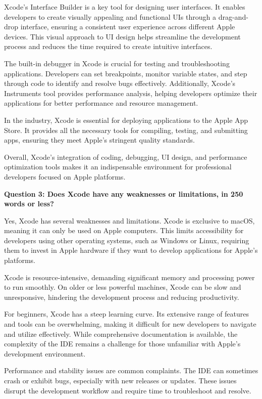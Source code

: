 \documentclass[a4paper, 11pt]{report}
\begin{document}
Xcode’s Interface Builder is a key tool for designing user interfaces. It enables developers to create visually appealing and functional UIs through a drag-and-drop interface, ensuring a consistent user experience across different Apple devices. This visual approach to UI design helps streamline the development process and reduces the time required to create intuitive interfaces.

The built-in debugger in Xcode is crucial for testing and troubleshooting applications. Developers can set breakpoints, monitor variable states, and step through code to identify and resolve bugs effectively. Additionally, Xcode’s Instruments tool provides performance analysis, helping developers optimize their applications for better performance and resource management.

In the industry, Xcode is essential for deploying applications to the Apple App Store. It provides all the necessary tools for compiling, testing, and submitting apps, ensuring they meet Apple’s stringent quality standards.

Overall, Xcode’s integration of coding, debugging, UI design, and performance optimization tools makes it an indispensable environment for professional developers focused on Apple platforms.

\vspace{\baselineskip}
\textbf{Question 3: Does Xcode have any weaknesses or limitations, in 250 words or less?}

Yes, Xcode has several weaknesses and limitations. Xcode is exclusive to macOS, meaning it can only be used on Apple computers. This limits accessibility for developers using other operating systems, such as Windows or Linux, requiring them to invest in Apple hardware if they want to develop applications for Apple's platforms.

Xcode is resource-intensive, demanding significant memory and processing power to run smoothly. On older or less powerful machines, Xcode can be slow and unresponsive, hindering the development process and reducing productivity.

For beginners, Xcode has a steep learning curve. Its extensive range of features and tools can be overwhelming, making it difficult for new developers to navigate and utilize effectively. While comprehensive documentation is available, the complexity of the IDE remains a challenge for those unfamiliar with Apple's development environment.

Performance and stability issues are common complaints. The IDE can sometimes crash or exhibit bugs, especially with new releases or updates. These issues disrupt the development workflow and require time to troubleshoot and resolve.
\end{document}
